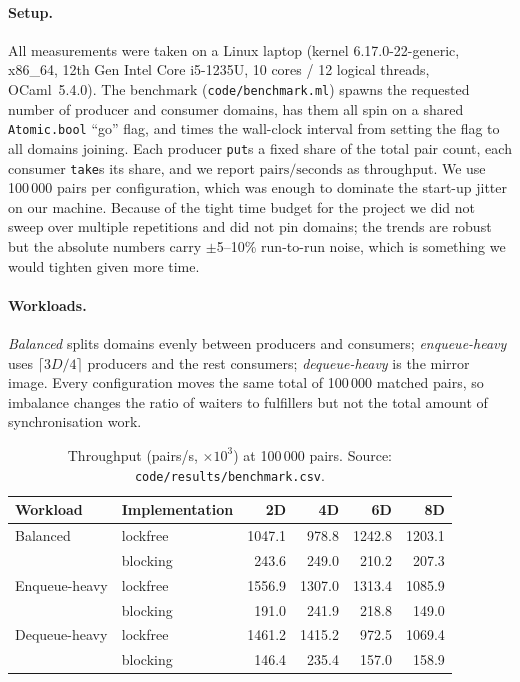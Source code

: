 \documentclass[11pt,a4paper]{article}
\begin{document}
\paragraph{Setup.}
All measurements were taken on a Linux laptop (kernel 6.17.0-22-generic,
x86\_64, 12th Gen Intel Core i5-1235U, 10 cores / 12 logical threads,
OCaml~5.4.0). The benchmark
(\texttt{code/benchmark.ml}) spawns the requested number of producer
and consumer domains, has them all spin on a shared
\texttt{Atomic.bool} ``go'' flag, and times the wall-clock interval
from setting the flag to all domains joining. Each producer
\texttt{put}s a fixed share of the total pair count, each consumer
\texttt{take}s its share, and we report
$\text{pairs}/\text{seconds}$ as throughput. We use 100\,000 pairs per
configuration, which was enough to dominate the start-up jitter on our
machine. Because of the tight time budget for the project we did not
sweep over multiple repetitions and did not pin domains; the trends are
robust but the absolute numbers carry $\pm$5--10\% run-to-run noise,
which is something we would tighten given more time.

\paragraph{Workloads.}
\emph{Balanced} splits domains evenly between producers and
consumers; \emph{enqueue-heavy} uses $\lceil 3D/4 \rceil$ producers
and the rest consumers; \emph{dequeue-heavy} is the mirror image.
Every configuration moves the same total of 100\,000 matched pairs, so
imbalance changes the ratio of waiters to fulfillers but not the total
amount of synchronisation work.

\begin{table}[h]
  \centering
  \small
  \caption{Throughput (pairs/s, $\times10^3$) at 100\,000 pairs.
  Source: \texttt{code/results/benchmark.csv}.}
  \label{tab:throughput}
  \begin{tabular}{@{}llrrrr@{}}
    \toprule
    Workload & Implementation & 2D & 4D & 6D & 8D \\
    \midrule
    Balanced       & lockfree  & 1047.1 &  978.8 & 1242.8 & 1203.1 \\
                   & blocking  &  243.6 &  249.0 &  210.2 &  207.3 \\
    \midrule
    Enqueue-heavy  & lockfree  & 1556.9 & 1307.0 & 1313.4 & 1085.9 \\
                   & blocking  &  191.0 &  241.9 &  218.8 &  149.0 \\
    \midrule
    Dequeue-heavy  & lockfree  & 1461.2 & 1415.2 &  972.5 & 1069.4 \\
                   & blocking  &  146.4 &  235.4 &  157.0 &  158.9 \\
    \bottomrule
  \end{tabular}
\end{table}
\end{document}
